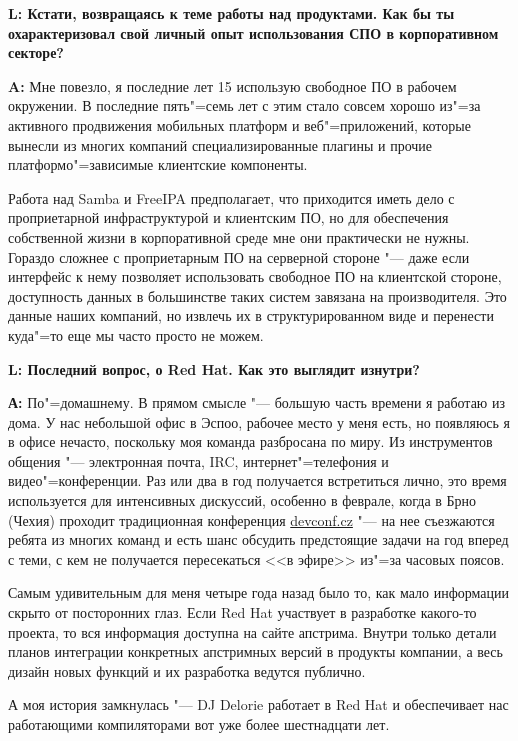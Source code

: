 \documentclass[10pt, a5paper]{article}
\begin{document}
{\noindent \bf L: Кстати, возвращаясь к теме работы над продуктами. Как бы ты
охарактеризовал свой личный опыт использования СПО в корпоративном секторе?}

{\noindent \bf A:} Мне повезло, я последние лет 15 использую свободное ПО в
рабочем окружении. В последние пять"=семь лет с этим стало совсем хорошо из"=за
активного продвижения мобильных платформ и веб"=приложений, которые вынесли из
многих компаний специализированные плагины и прочие платформо"=зависимые
клиентские компоненты.

Работа над Samba и FreeIPA предполагает, что приходится иметь дело с
проприетарной инфраструктурой и клиентским ПО, но для обеспечения собственной
жизни в корпоративной среде мне они практически не нужны. Гораздо сложнее
с проприетарным ПО на серверной стороне "--- даже если интерфейс к нему позволяет
использовать свободное ПО на клиентской стороне, доступность данных в
большинстве таких систем завязана на производителя. Это данные наших компаний,
но извлечь их в структурированном виде и перенести куда"=то еще мы часто просто
не можем.

{\noindent \bf L: Последний вопрос, о Red Hat. Как это выглядит изнутри?}

{\noindent \bf А:} По"=домашнему. В прямом смысле "--- большую часть времени
я работаю из дома. У нас небольшой офис в Эспоо, рабочее место у меня есть, но
появляюсь я в офисе нечасто, поскольку моя команда разбросана по миру. Из инструментов
общения "--- электронная почта, IRC, интернет"=телефония и видео"=конференции.
Раз или два в год получается встретиться лично, это время используется для интенсивных
дискуссий, особенно в феврале, когда в Брно (Чехия) проходит традиционная конференция
\url{devconf.cz} "--- на нее съезжаются ребята из многих команд и есть шанс обсудить
предстоящие задачи на год вперед с теми, с кем не получается пересекаться <<в эфире>>
из"=за часовых поясов.

Самым удивительным для меня четыре года назад было то, как мало информации скрыто от
посторонних глаз. Если Red Hat участвует в разработке какого-то проекта, то вся информация
доступна на сайте апстрима. Внутри только детали планов интеграции конкретных апстримных
версий в продукты компании, а весь дизайн новых функций и их разработка ведутся публично.

А моя история замкнулась "--- DJ Delorie работает в Red Hat и обеспечивает нас
работающими компиляторами вот уже более шестнадцати лет.
 
\end{document}
